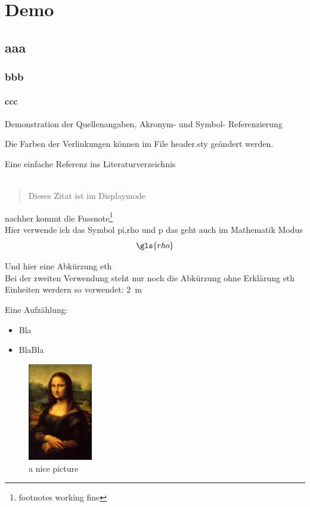 \chapter{Demo}\label{chp:demo}
\section{aaa}\label{sec:aaa}
\subsection{bbb}
\subsubsection{ccc}


Demonstration der Quellenangaben, Akronym- und Symbol- Referenzierung

Die Farben der Verlinkungen können im File header.sty geändert werden.

Eine einfache Referenz ins Literaturverzeichnis\cite{einstein}\\

\\
\blockcquote{einstein}{Dieses Zitat ist im Displaymode}

nachher kommt die Fussnote\footnote{footnotes working fine}\\

Hier verwende ich das Symbol \gls{pi},\gls{rho} und \gls{p} das geht auch im Mathematik Modus \\

$$\gls{rho}$$

Und hier eine Abkürzung \gls{eth}\\
Bei der zweiten Verwendung steht nur noch die Abkürzung ohne Erklärung \gls{eth}\\[5mm]

Einheiten werdern so verwendet: \SI{2}{m}


Eine Aufzählung:
\begin{itemize}
    \item Bla
    \item BlaBla
\end{itemize}


\begin{figure}[H]
    \centering
    \includegraphics[width=0.25\textwidth]{./mainmatter/pictures/Demo/Mona_Lisa}
    \caption{a nice picture}
    \label{img:MonaLisa}
\end{figure}


